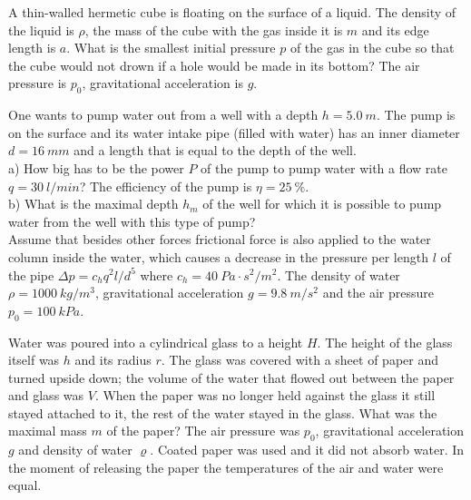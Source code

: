 \documentclass[11pt]{article}
\begin{document}

\probeng
A thin-walled hermetic cube is floating on the surface of a liquid. The density of the liquid is $\rho$, the mass of the cube with the gas inside it is $m$ and its edge length is $a$. What is the smallest initial pressure $p$ of the gas in the cube so that the cube would not drown if a hole would be made in its bottom? The air pressure is $p_0$, gravitational acceleration is $g$.
\probend
\bigskip


\probeng
One wants to pump water out from a well with a depth $h=\SI{5.0}{m}$. The pump is on the surface and its water intake pipe (filled with water) has an inner diameter $d=\SI{16}{mm}$ and a length that is equal to the depth of the well.\\
a) How big has to be the power $P$ of the pump to pump water with a flow rate $q=\SI{30}{l/min}$? The efficiency of the pump is $\eta=\SI{25}{\percent}$.\\
b) What is the maximal depth $h_{m}$ of the well for which it is possible to pump water from the well with this type of pump?\\
Assume that besides other forces frictional force is also applied to the water column inside the water, which causes a decrease in the pressure per length $l$ of the pipe $\Delta p=c_{h}q^{2}l/d^{5}$ where $c_{h}=\SI{40}{Pa\cdot s^{2}/m^{2}}$. The density of water $\rho=\SI{1000}{kg/m^{3}}$, gravitational acceleration $g=\SI{9.8}{m/s^{2}}$ and the air pressure $p_{0}=\SI{100}{kPa}$.
\probend
\bigskip


\probeng
Water was poured into a cylindrical glass to a height $H$. The height of the glass itself was $h$ and its radius $r$. The glass was covered with a sheet of paper and turned upside down; the volume of the water that flowed out between the paper and glass was $V$. When the paper was no longer held against the glass it still stayed attached to it, the rest of the water stayed in the glass. What was the maximal mass $m$ of the paper? The air pressure was $p_0$, gravitational acceleration $g$ and density of water $\varrho$. Coated paper was used and it did not absorb water. In the moment of releasing the paper the temperatures of the air and water were equal.
\probend
\bigskip
\end{document}
